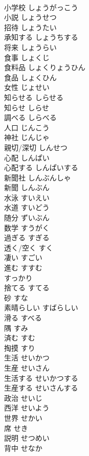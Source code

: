 \documentclass[8pt]{extreport}
\begin{document}
\begin{CJK}{UTF8}{min}
\\	小学校	しょうがっこう	
\\	小説	しょうせつ	
\\	招待	しょうたい	
\\	承知する	しょうちする	
\\	将来	しょうらい	
\\	食事	しょくじ	
\\	食料品	しょくりょうひん	
\\	食品	しょくひん	
\\	女性	じょせい	
\\	知らせる	しらせる	
\\	知らせ	しらせ	
\\	調べる	しらべる	
\\	人口	じんこう	
\\	神社	じんじゃ	
\\	親切/深切	しんせつ	
\\	心配	しんぱい	
\\	心配する	しんぱいする	
\\	新聞社	しんぶんしゃ	
\\	新聞	しんぶん	
\\	水泳	すいえい	
\\	水道	すいどう	
\\	随分	ずいぶん	
\\	数学	すうがく	
\\	過ぎる	すぎる	
\\	透く/空く	すく	
\\	凄い	すごい	
\\	進む	すすむ	
\\	すっかり		
\\	捨てる	すてる	
\\	砂	すな	
\\	素晴らしい	すばらしい	
\\	滑る	すべる	
\\	隅	すみ	
\\	済む	すむ	
\\	掏摸	すり	
\\	生活	せいかつ	
\\	生産	せいさん	
\\	生活する	せいかつする	
\\	生産する	せいさんする	
\\	政治	せいじ	
\\	西洋	せいよう	
\\	世界	せかい	
\\	席	せき	
\\	説明	せつめい	
\\	背中	せなか	

\end{CJK}
\end{document}
